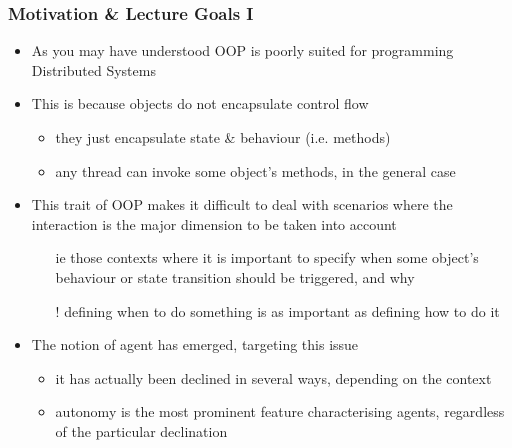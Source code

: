 \documentclass[presentation]{beamer}\mode<presentation>{\usetheme{AMSCesenaPurpleAndGold}}
\begin{document}
\begin{frame}
\frametitle{Motivation \& Lecture Goals I}

\begin{itemize}
	\item As you may have understood OOP is poorly suited for programming Distributed Systems
	
	\vfill
	
	\item This is because \alert{objects do not encapsulate control flow}
	\begin{itemize}
	    \item they just encapsulate state \& behaviour (i.e. methods)
	    
	    \item any thread can invoke some object's methods, in the general case
	\end{itemize}
	
	\vfill
	
	\item This trait of OOP makes it difficult to deal with scenarios where the \alert{interaction} is the major dimension to be taken into account
    \begin{itemize}
        \item[ie] those contexts where it is important to specify \alert{when} some object's behaviour or state transition should be triggered, and \alert{why}
        \item[!] defining \alert{when} to do something is as important as defining \alert{how} to do it
    \end{itemize}
    
    \vfill
    
    \item The notion of \alert{agent} has emerged, targeting this issue
    \begin{itemize}
        \item it has actually been declined in several ways, depending on the context
        \item \alert{autonomy} is the most prominent feature characterising agents, regardless of the particular declination
    \end{itemize}
\end{itemize}

\end{frame}
\end{document}
